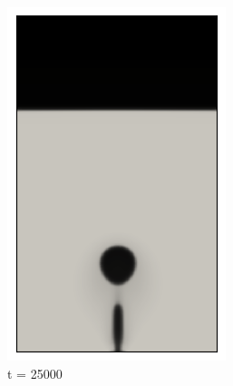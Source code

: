 \begin{figure}[H]
	\medskip
	\begin{subfigure}{0.25\textwidth}
		\includegraphics[width=\linewidth]{figs/cap4/cuda_bb_760_s25}
		\caption{t = 25000}
		\label{fig:4}
	\end{subfigure}\hfil  
	\begin{subfigure}{0.25\textwidth}

\end{subfigure}
\end{figure}
